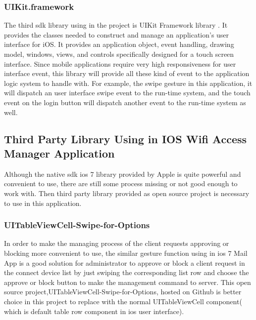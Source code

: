 \subsubsection{UIKit.framework}
\par The third \gls{sdk} library using in the project is UIKit Framework library \cite{uikitlib}. It provides the classes needed to construct and manage an application’s user interface for iOS. It provides an application object, event handling, drawing model, windows, views, and controls specifically designed for a touch screen interface. Since mobile applications require very high responsiveness for user interface event, this library will provide all these kind of event to the application logic system to handle with. For example, the swipe gesture in this application, it will dispatch an user interface swipe event to the run-time system, and the touch event on the login button will dispatch another event to the run-time system as well.

\subsection{Third Party Library Using in IOS Wifi Access Manager Application}

\par Although the native \gls{sdk} \gls{ios} 7 library provided by Apple is quite powerful and convenient to use, there are still some process missing or not good enough to work with. Then third party library provided as open source project is necessary to use in this application.

\subsubsection{UITableViewCell-Swipe-for-Options}
\par In order to make the managing process of the client requests approving or blocking more convenient to use, the similar gesture function using in \gls{ios} 7 Mail App is a good solution for administrator to approve or block a client request in the connect device list by just swiping the corresponding list row and choose the approve or block button to make the management command to server. This open source project,UITableViewCell-Swipe-for-Options\cite{swipe-for-options}, hosted on Github is better choice in this project to replace with the normal UITableViewCell component( which is default table row component in \gls{ios} user interface).


